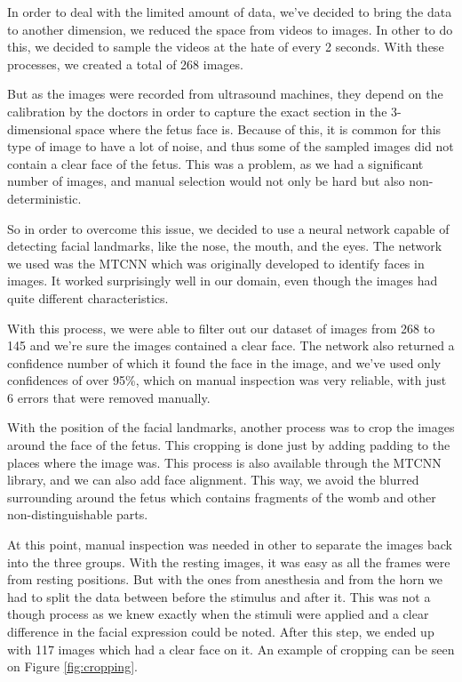 In order to deal with the limited amount of data, we've decided to bring the data to another dimension, we reduced the space from videos to images. In other to do this, we decided to sample the videos at the hate of every 2 seconds. With these processes, we created a total of 268 images.

But as the images were recorded from ultrasound machines, they depend on the calibration by the doctors in order to capture the exact section in the 3-dimensional space where the fetus face is. Because of this, it is common for this type of image to have a lot of noise, and thus some of the sampled images did not contain a clear face of the fetus. This was a problem, as we had a significant number of images, and manual selection would not only be hard but also non-deterministic.

So in order to overcome this issue, we decided to use a neural network capable of detecting facial landmarks, like the nose, the mouth, and the eyes. The network we used was the MTCNN \cite{ZhangZL016} which was originally developed to identify faces in images. It worked surprisingly well in our domain, even though the images had quite different characteristics.

With this process, we were able to filter out our dataset of images from 268 to 145 and we're sure the images contained a clear face. The network also returned a confidence number of which it found the face in the image, and we've used only confidences of over 95\%, which on manual inspection was very reliable, with just 6 errors that were removed manually.

With the position of the facial landmarks, another process was to crop the images around the face of the fetus. This cropping is done just by adding padding to the places where the image was. This process is also available through the MTCNN library, and we can also add face alignment. This way, we avoid the blurred surrounding around the fetus which contains fragments of the womb and other non-distinguishable parts. 

At this point, manual inspection was needed in other to separate the images back into the three groups. With the resting images, it was easy as all the frames were from resting positions. But with the ones from anesthesia and from the horn we had to split the data between before the stimulus and after it. This was not a though process as we knew exactly when the stimuli were applied and a clear difference in the facial expression could be noted. After this step, we ended up with 117 images which had a clear face on it. An example of cropping can be seen on Figure \ref{fig:cropping}.


